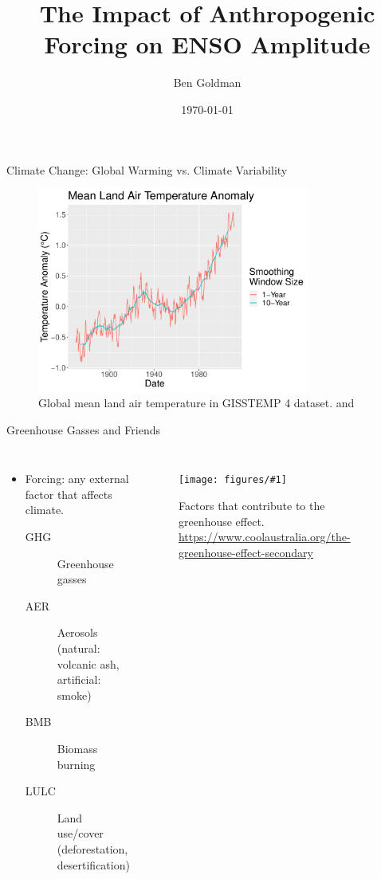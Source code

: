 \documentclass{beamer}
\title{The Impact of Anthropogenic Forcing on ENSO Amplitude}
\author{Ben Goldman}
\date{\today}
\newcommand{\myfig}[3]{
  \begin{figure}
    \centering
    \texttt{[image: figures/\#1]}
    \caption{#2}
    \label{fig:#3}
  \end{figure}
}
\begin{document}
\maketitle

\begin{frame}{Climate Change: Global Warming vs. Climate Variability}
  \begin{figure}
    \centering
    \includegraphics[width=0.8\textwidth]{figures/intro_fig_3.pdf}
    \caption{Global mean land air temperature in GISSTEMP 4 dataset. \citep{gistemp2019giss} and \citep{lenssen2019improvements}}
    \label{fig:woohoo}
  \end{figure}
\end{frame}

\begin{frame}{Greenhouse Gasses and Friends}
  \begin{columns}
    \begin{itemize}
    \item \alert{Forcing}: any external factor that affects climate.
      \begin{description}
      \item[\alert{GHG}] Greenhouse gasses
      \item[\alert{AER}] Aerosols (natural: volcanic ash, artificial: smoke)
      \item[\alert{BMB}] Biomass burning
      \item[\alert{LULC}] Land use/cover (deforestation, desertification)
      \end{description}
    \end{itemize}
    \myfig{greenhouse_Effect.jpg}{Factors that contribute to the greenhouse effect. \url{https://www.coolaustralia.org/the-greenhouse-effect-secondary}}{this}
  \end{columns}
\end{frame}
\end{document}
